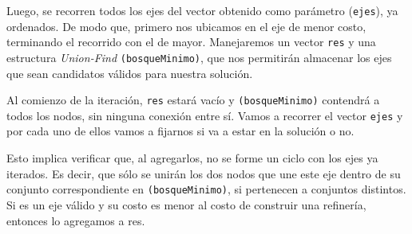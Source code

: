 
Luego, se recorren todos los ejes del vector obtenido como par\'ametro (\texttt{ejes}), ya ordenados. De modo que, primero nos ubicamos en el eje de menor costo, terminando el recorrido con el de mayor. Manejaremos un vector \texttt{res} y una estructura \emph{Union-Find} \texttt{(bosqueMinimo)}, que nos permitir\'an almacenar los ejes que sean candidatos v\'alidos para nuestra soluci\'on.

Al comienzo de la iteraci\'on, \texttt{res} estar\'a vac\'io y \texttt{(bosqueMinimo)} contendr\'a a todos los nodos, sin ninguna conexi\'on entre s\'i. Vamos a recorrer el vector \texttt{ejes} y por cada uno de ellos vamos a fijarnos si va a estar en la soluci\'on o no.

Esto implica verificar que, al agregarlos, no se forme un ciclo con los ejes ya iterados. Es decir, que s\'olo se unir\'an los dos nodos que une este eje dentro de su conjunto correspondiente en \texttt{(bosqueMinimo)}, si pertenecen a conjuntos distintos. Si es un eje v\'alido y su costo es menor al costo de construir una refiner\'ia, entonces lo agregamos a res.\\



